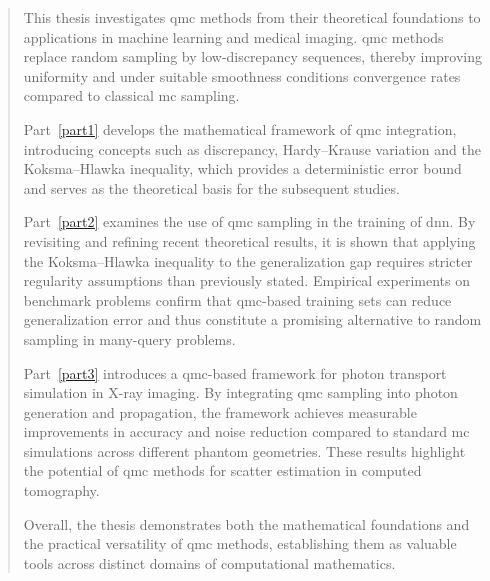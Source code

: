 \documentclass[
11pt, %
english, %
singlespacing, %
headsepline, %
]{MastersThesis} %
\theoremstyle{definition}
\theoremstyle{definition}
\theoremstyle{definition}
\theoremstyle{definition}
\theoremstyle{remark}
\theoremstyle{remark}
\begin{document}
\begin{abstract}
\addchaptertocentry{\abstractname}
This thesis investigates \ac{qmc} methods from their theoretical foundations to applications in machine learning and medical imaging. \ac{qmc} methods replace random sampling by low-discrepancy sequences, thereby improving uniformity and under suitable smoothness conditions convergence rates compared to classical \ac{mc} sampling.

Part~\ref{part1} develops the mathematical framework of \ac{qmc} integration, introducing concepts such as discrepancy, Hardy--Krause variation and the Koksma--Hlawka inequality, which provides a deterministic error bound and serves as the theoretical basis for the subsequent studies.

Part~\ref{part2} examines the use of \ac{qmc} sampling in the training of \ac{dnn}. By revisiting and refining recent theoretical results, it is shown that applying the Koksma--Hlawka inequality to the generalization gap requires stricter regularity assumptions than previously stated. Empirical experiments on benchmark problems confirm that \ac{qmc}-based training sets can reduce generalization error and thus constitute a promising alternative to random sampling in many-query problems.

Part~\ref{part3} introduces a \ac{qmc}-based framework for photon transport simulation in X-ray imaging. By integrating \ac{qmc} sampling into photon generation and propagation, the framework achieves measurable improvements in accuracy and noise reduction compared to standard \ac{mc} simulations across different phantom geometries. These results highlight the potential of \ac{qmc} methods for scatter estimation in computed tomography.

Overall, the thesis demonstrates both the mathematical foundations and the practical versatility of \ac{qmc} methods, establishing them as valuable tools across distinct domains of computational mathematics.
\end{abstract}


\end{document}
